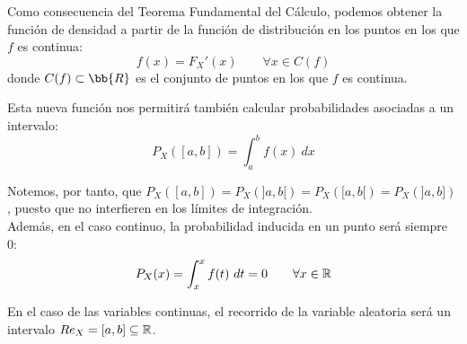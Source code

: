 Como consecuencia del Teorema Fundamental del Cálculo, podemos obtener la función de densidad a partir de la función de distribución en los puntos en los que $f$ es continua:
$$f(x) = F_X'(x) \qquad \forall x \in C(f)$$
donde $C(f)\subset \bb{R}$ es el conjunto de puntos en los que $f$ es continua.

Esta nueva función nos permitirá también calcular probabilidades asociadas a un intervalo:
$$P_X([a,b]) = \int_a^b f(x)~dx$$

Notemos, por tanto, que $P_X([a,b]) = P_X(]a,b[) = P_X([a,b[) = P_X(]a,b])$, puesto que no interfieren en los límites de integración.\\

Además, en el caso continuo, la probabilidad inducida en un punto será siempre~$0$:
$$P_X(x) = \int_x^x f(t)~dt = 0 \qquad \forall x \in \mathbb R$$

En el caso de las variables continuas, el recorrido de la variable aleatoria será un intervalo $Re_X = [a,b] \subseteq \mathbb R$.

